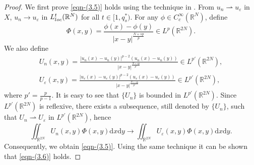 \documentclass[10pt,a4paper]{amsart}
\numberwithin{equation}{section}
\begin{document}
\begin{proof}
We first prove \eqref{eqn-(3.5)} holds using the technique in \cite{n5}.
From $u_n \rightharpoonup u_{\varepsilon}$ in $X$,  $u_n \to u_{\varepsilon}$ in 
$L_{\rm loc}^t(\mathbb{R}^N)$ for all $t \in [1,q_{s}^{\ast})$.
For any $\phi \in C_c^{\infty}(\mathbb{R}^N)$, define
\[
\Phi(x,y) = \frac{\phi(x) - \phi(y)}{|x - y|^{\frac{N+sp}{p}}} \in L^p(\mathbb{R}^{2N}).
\]
We also define
\begin{gather*}
U_n(x,y) = \frac{|u_n(x) - u_n(y)|^{p-2}(u_n(x) - u_n(y))}{|x - y|^{\frac{N+sp}{p'}}}
\in L^{p'}(\mathbb{R}^{2N}), \\
U_\varepsilon(x,y) = \frac{|u_\varepsilon(x) 
- u_\varepsilon(y)|^{p-2}(u_\varepsilon(x) - u_\varepsilon(y))}{|x - y|^{\frac{N+sp}{p'}}}
\in L^{p'}(\mathbb{R}^{2N}),
\end{gather*}
where $p' = \frac{p}{p-1}$. It is easy to see that $\{U_n\}$ is  bounded in 
$L^{p'}(\mathbb{R}^{2N})$. Since $L^{p'}(\mathbb{R}^{2N})$ is reflexive,  
there exists a subsequence, still denoted by $\{U_n\}$, such
that  $U_n \rightharpoonup U_\varepsilon$ in $L^{p'}(\mathbb{R}^{2N})$, hence
\[
\iint_{\mathbb{R}^{2N}} U_n(x,y)\Phi(x,y)\mathrm{d}x\mathrm{d}y 
\to \iint_{\mathbb{R}^{2N}} U_\varepsilon(x,y)\Phi(x,y)\mathrm{d}x\mathrm{d}y.
\]
Consequently, we obtain \eqref{eqn-(3.5)}.
Using the same technique it can be shown that \eqref{eqn-(3.6)} holds.


\end{proof}
\end{document}
